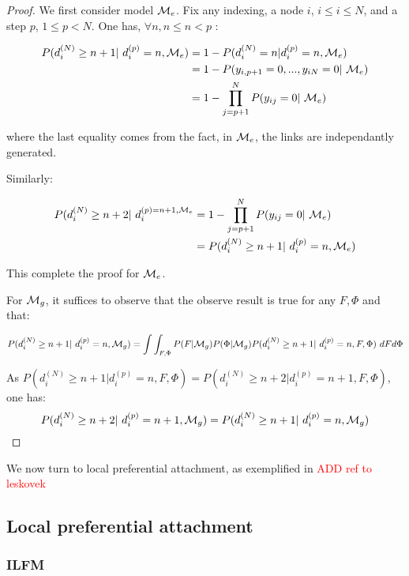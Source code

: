 \begin{proof}
We first consider model $\mathcal{M}_e$. Fix any indexing, a node $i$, $i \leq i \leq N$, and a step $p$, $1 \leq p < N$. One has, $\forall n, n \leq n < p$ :

\begin{align*}
P(d_i^{(N)} \geq n+1 | d_i^{(p)}=n, \M_e) &= 1 - P(d_i^{(N)}=n | d_i^{(p)}=n, \M_e) \\
        &= 1 -P(y_{i,p+1}=0, ...,y_{iN}=0 | \M_e ) \\
        &= 1 - \prod_{j=p+1}^N P(y_{ij}=0 | \M_e)
\end{align*}

where the last equality comes from the fact, in $\mathcal{M}_e$, the links are independantly generated.

Similarly:

\begin{align*}
P(d_i^{(N)} \geq n+2 | d_i^{(p)=n+1, \M_e} &= 1 - \prod_{j=p+1}^N P(y_{ij}=0 | \M_e) \\
                    &=P(d_i^{(N)} \geq n+1 | d_i^{(p)}=n, \M_e)
\end{align*}

This complete the proof for $\mathcal{M}_e$.

For $\mathcal{M}_g$, it suffices to observe that the observe result is true for any $F, \Phi$ and that:

\begin{equation*}
P(d_i^{(N)} \geq n+1 | d_i^{(p)}=n, \M_g)  = \int\int_{F,\Phi} P(F|\M_g)P(\Phi|\M_g) P(d_i^{(N)} \geq n+1 | d_i^{(p)}=n, F, \Phi) \ dF d\Phi
\end{equation*}

As $P(d_i^{(N)} \geq n+1 | d_i^{(p)}=n, F, \Phi) = P(d_i^{(N)} \geq n+2 | d_i^{(p)}=n+1, F, \Phi)$, one has:
\begin{equation*}
P(d_i^{(N)} \geq n+2 | d_i^{(p)}=n+1, \M_g) = P(d_i^{(N)} \geq n+1 | d_i^{(p)}=n, \M_g)
\end{equation*}

\end{proof}


We now turn to local preferential attachment, as exemplified in \textcolor{red}{ADD ref to leskovek}


\subsection{Local preferential attachment}

\subsubsection{ILFM}

